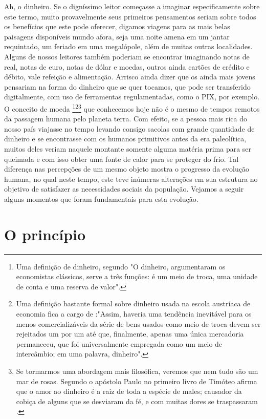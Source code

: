Ah, o dinheiro. Se o digníssimo leitor começasse a imaginar especificamente sobre este termo, muito provavelmente seus primeiros pensamentos seriam sobre todos os benefícios que este pode oferecer, digamos viagens para as mais belas paisagens disponíveis mundo afora, seja uma noite amena em um jantar requintado, um feriado em uma megalópole, além de muitas outras localidades. Alguns de nossos leitores também poderiam se encontrar imaginando notas de real, notas de euro, notas de dólar e moedas, outros ainda cartões de crédito e débito, vale refeição e alimentação. Arrisco ainda dizer que os ainda mais jovens pensariam na forma do dinheiro que se quer tocamos, que pode ser transferido digitalmente, com uso de ferramentas regulamentadas, como o PIX, por exemplo.  O conceito de moeda \footnote{Uma definição de dinheiro, segundo \cite{KRUNGMAN} "O dinheiro, argumentaram os economistas clássicos, serve a três funções: é um meio de troca, uma unidade de conta e uma reserva de valor".}\footnote{Uma definição bastante formal sobre dinheiro usada na escola austríaca de economia fica a cargo de \cite{MISESA}:"Assim, haveria uma tendência inevitável para os menos comercializáveis ​​da série de bens usados ​​como meio de troca devem ser rejeitados um por um até que, finalmente, apenas uma única mercadoria permaneceu, que foi universalmente empregada como um meio de intercâmbio; em uma palavra, dinheiro".}\footnote{ Se tormarmos uma abordagem mais filosófica, veremos que nem tudo são um mar de rosas. Segundo o apóstolo Paulo no primeiro livro de Timóteo afirma que o amor ao dinheiro é a raiz de toda a espécie de males; causador da cobiça de alguns que se desviaram da fé, e com muitas dores se traspassaram \cite{BIBLE1}.} que conhecemos hoje não é o mesmo de tempos remotos da passagem humana pelo planeta terra. Com efeito, se a pessoa mais rica do nosso país viajasse no tempo levando consigo sacolas com grande quantidade de dinheiro e se encontrasse com os humanos primitivos antes da era paleolítica, muitos deles veriam naquele montante somente alguma matéria prima para ser queimada e com isso obter uma fonte de calor para se proteger do frio. Tal diferença nas percepções de um mesmo objeto mostra o progresso da evolução humana, no qual neste tempo, este teve inúmeras alterações em sua estrutura no objetivo de satisfazer as necessidades sociais da população. Vejamos a seguir alguns momentos que foram fundamentais para esta evolução. 

\section{O princípio}

